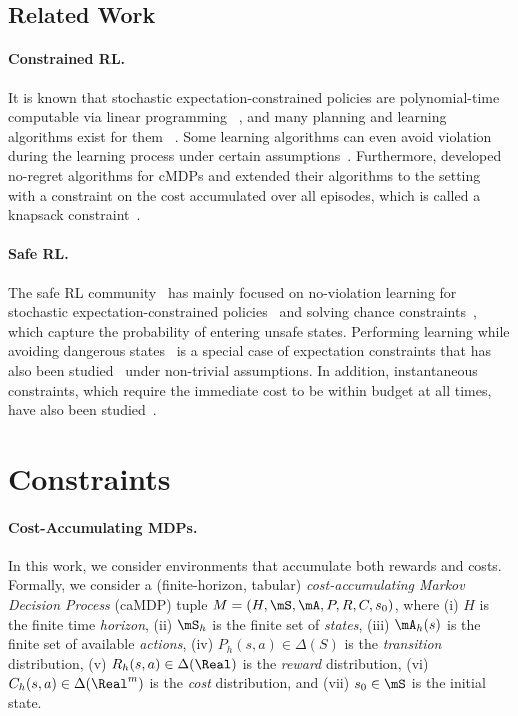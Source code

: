 \documentclass[pdftex, a4paper, 12pt]{article}
\begin{document}
\subsection{Related Work}\label{subsec: related-work}

\paragraph{Constrained RL.} It is known that stochastic expectation-constrained policies are polynomial-time computable via linear programming ~\cite{cMDP-book}, and many planning and learning algorithms exist for them ~\cite{cMDP-ZeroDualityGap, cMDP-Pac, cMDP-Actor-Critic, cMDP-sample-complexity-safe}. Some learning algorithms can even avoid violation during the learning process under certain assumptions~\cite{cMDP-Model-Violation-Free, NoViolationPolicyGradient}. Furthermore, \citet{Knap-Brantley} developed no-regret algorithms for cMDPs and extended their algorithms to the setting with a constraint on the cost accumulated over all episodes, which is called a knapsack constraint~\cite{Knap-Brantley, Knap-PreBrantley}.


\paragraph{Safe RL.} The safe RL community~\cite{SafeComprSurvey, SafeReview} has mainly focused on no-violation learning for stochastic expectation-constrained policies~\cite{SafeLyapunov, SafeE4, SafeShielding, SafeBarrier, SafeStable} and solving chance constraints~\cite{SafeHardBarrier, SafeStateSurvey}, which capture the probability of entering unsafe states. Performing learning while avoiding dangerous states~\cite{SafeStateSurvey} is a special case of expectation constraints that has also been studied~\cite{SafeStatePAC, Safe-RL-Imagining} under non-trivial assumptions. In addition, instantaneous constraints, which require the immediate cost to be within budget at all times, have also been studied~\cite{InstantaneousSafeRL, PreInstantaneous1, PreInstantaneous2}.

\section{Constraints}\label{sec: constraints}

\paragraph{Cost-Accumulating MDPs.} In this work, we consider environments that accumulate both rewards and costs. Formally, we consider a (finite-horizon, tabular) \emph{cost-accumulating Markov Decision Process} (caMDP) tuple $M = (H, \mS, \mA, P, R, C, s_0)$, where (i) $H$ is the finite time \emph{horizon}, (ii) $\mS_h$ is the finite set of \emph{states}, (iii) $\mA_h(s)$ is the finite set of available \emph{actions}, (iv) $P_h(s, a) \in \Delta(S)$ is the \emph{transition} distribution, (v) $R_h(s, a) \in \Delta(\Real)$ is the \emph{reward} distribution, (vi) $C_h(s,a) \in \Delta(\Real^m)$ is the \emph{cost} distribution, and (vii) $s_0 \in \mS$ is the initial state. 
\end{document}
